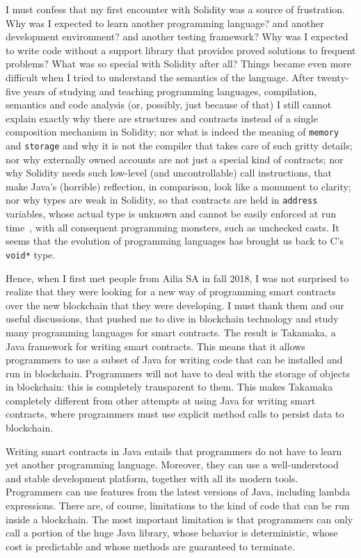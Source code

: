 I must confess that my first encounter with Solidity
was a source of frustration. Why was I expected to learn another programming
language? and another development environment? and another testing framework?
Why was I expected to write code without a support library that provides
proved solutions to frequent problems?
What was so special with Solidity after all? Things became even more difficult when
I tried to understand the semantics of the language. After twenty-five years of studying
and teaching programming languages, compilation, semantics and code analysis
(or, possibly, just because of that) I still cannot explain exactly why there
are structures and contracts instead of a single composition mechanism in Solidity;
nor what is indeed the meaning of \texttt{memory} and \texttt{storage} and why
it is not the compiler that takes care of such gritty details; nor why
externally owned accounts are not just a special kind of contracts;
nor why Solidity needs such low-level (and uncontrollable)
call instructions, that make Java's (horrible) reflection, in comparison, look like
a monument to clarity;
nor why types are weak in Solidity, so that contracts are held in
\texttt{address}
variables, whose actual type is unknown and cannot be easily
enforced at run time~\cite{CrafaPZ19}, with all consequent
programming monsters, such as unchecked casts. It seems that the evolution
of programming languages has brought us back to C's \texttt{void*} type.

Hence, when I first met people from Ailia SA in fall 2018, I was not surprised
to realize that they were looking for a new way of programming smart contracts
over the new blockchain that they were developing. I must thank them and our useful
discussions, that pushed me to dive in blockchain technology and
study many programming languages for smart contracts. The result
is Takamaka, a Java framework for writing smart contracts.
This means that it allows programmers to use a subset of Java for writing code
that can be installed and run in blockchain. Programmers will not have
to deal with the storage of objects in blockchain: this is completely
transparent to them. This makes Takamaka completely different from other
attempts at using Java for writing smart contracts, where programmers
must use explicit method calls to persist data to blockchain.

Writing smart contracts in Java entails that programmers
do not have to learn yet another programming language.
Moreover, they can use a well-understood and stable development
platform, together with all its modern tools. Programmers can use
features from the latest versions of Java, including lambda
expressions.
There are, of course, limitations to the kind of code that can
be run inside a blockchain. The most important limitation is
that programmers can only call a portion of the huge Java library,
whose behavior is deterministic, whose cost is predictable and whose methods are guaranteed
to terminate.

